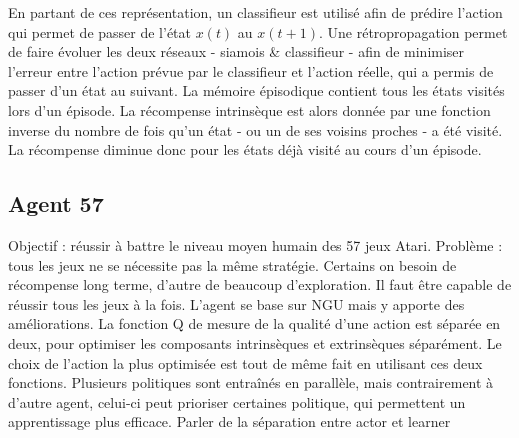 \documentclass[a4paper,12pt]{report}
\begin{document}
\newline En partant de ces représentation, un classifieur est utilisé afin de prédire l’action qui permet de passer de l’état $x(t)$ au $x(t+1)$. Une rétropropagation permet de faire évoluer les deux réseaux - siamois \& classifieur - afin de minimiser l’erreur entre l’action prévue par le classifieur et l’action réelle, qui a permis de passer d'un état au suivant.
\newline
\newline \indent  La mémoire épisodique contient tous les états visités lors d'un épisode. La récompense intrinsèque est alors donnée par une fonction inverse du nombre de fois qu’un état - ou un de ses voisins proches - a été visité. La récompense diminue donc pour les états déjà visité au cours d'un épisode.

\subsection{Agent 57 \cite{agent57}}
\indent Objectif : réussir à battre le niveau moyen humain des 57 jeux Atari. Problème : tous les jeux ne se nécessite pas la même stratégie. Certains on besoin de récompense long terme, d’autre de beaucoup d’exploration. Il faut être capable de réussir tous les jeux à la fois.
\newline \indent  L’agent se base sur NGU mais y apporte des améliorations. La fonction Q de mesure de la qualité d’une action est séparée en deux, pour optimiser les composants intrinsèques et extrinsèques séparément. Le choix de l’action la plus optimisée est tout de même fait en utilisant ces deux fonctions.
\newline \indent  Plusieurs politiques sont entraînés en parallèle, mais contrairement à d’autre agent, celui-ci peut prioriser certaines politique, qui permettent un apprentissage plus efficace.
\newline
\newline \indent  Parler de la séparation entre actor et learner
\end{document}

